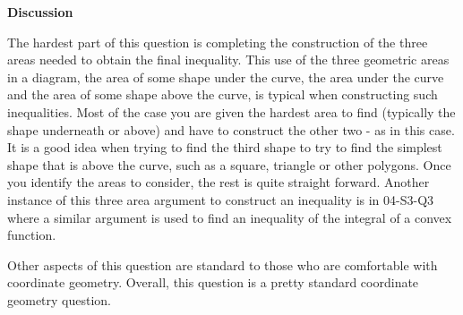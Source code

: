 \documentclass{article}
\begin{document}
\newpage

\begin{center}
    \textbf{Discussion}
\end{center}

\vspace{0.5cm}

The hardest part of this question is completing the construction of the three areas needed to obtain the final inequality. This use of the three geometric areas in a diagram, the area of some shape under the curve, the area under the curve and the area of some shape above the curve, is typical when constructing such inequalities. Most of the case you are given the hardest area to find (typically the shape underneath or above) and have to construct the other two - as in this case. It is a good idea when trying to find the third shape to try to find the simplest shape that is above the curve, such as a square,  triangle or other polygons. Once you identify the areas to consider, the rest is quite straight forward. Another instance of this three area argument to construct an inequality is in 04-S3-Q3 where a similar argument is used to find an inequality of the integral of a convex function.\par

\quad Other aspects of this question are standard to those who are comfortable with coordinate geometry. Overall, this question is a pretty standard coordinate geometry question. 
\end{document}
